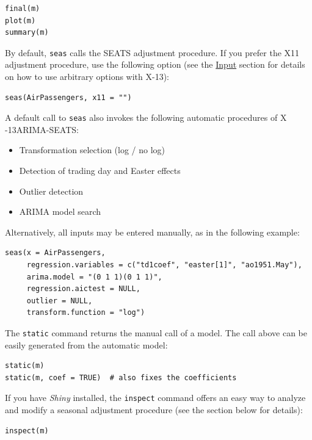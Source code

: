 \begin{verbatim}
final(m)
plot(m)
summary(m)
\end{verbatim}

By default, \texttt{seas} calls the SEATS adjustment procedure. If you
prefer the X11 adjustment procedure, use the following option (see the
\hyperref[input]{Input} section for details on how to use arbitrary
options with X-13):

\begin{verbatim}
seas(AirPassengers, x11 = "")
\end{verbatim}

A default call to \texttt{seas} also invokes the following automatic
procedures of X -13ARIMA-SEATS:

\begin{itemize}
\itemsep1pt\parskip0pt
\item
  Transformation selection (log / no log)
\item
  Detection of trading day and Easter effects
\item
  Outlier detection
\item
  ARIMA model search
\end{itemize}

Alternatively, all inputs may be entered manually, as in the following
example:

\begin{verbatim}
seas(x = AirPassengers, 
     regression.variables = c("td1coef", "easter[1]", "ao1951.May"), 
     arima.model = "(0 1 1)(0 1 1)", 
     regression.aictest = NULL,
     outlier = NULL, 
     transform.function = "log")
\end{verbatim}

The \texttt{static} command returns the manual call of a model. The call
above can be easily generated from the automatic model:

\begin{verbatim}
static(m)
static(m, coef = TRUE)  # also fixes the coefficients
\end{verbatim}

If you have \emph{Shiny} installed, the \texttt{inspect} command offers
an easy way to analyze and modify a seasonal adjustment procedure (see
the section below for details):

\begin{verbatim}
inspect(m)
\end{verbatim}


